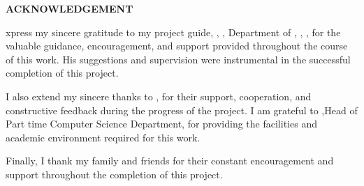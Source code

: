 \vspace*{50pt}

\begin{center}
\textbf{ACKNOWLEDGEMENT}\\
\end{center}%
%
\newenvironment{acknowledgement}


I express my sincere gratitude to my project guide, \textbf{\guide}, \guidedes, Department of \dept, \college, \collegeplace, for the valuable guidance, encouragement, and support provided throughout the course of this work. His suggestions and supervision were instrumental in the successful completion of this project.\par

I also extend my sincere thanks to \textbf{\semcoordinatorA}, for their support, cooperation, and constructive feedback during the progress of the project. I am grateful to \textbf{\hod},Head of Part time Computer Science Department, for providing the facilities and academic environment required for this work.\par

Finally, I thank my family and friends for their constant encouragement and support throughout the completion of this project.

\vspace*{30pt}
\begin{flushright}
	\textbf{\author}
\end{flushright}
\thispagestyle{plain}
